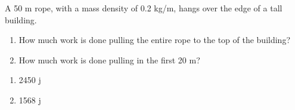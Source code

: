 {A 50 m rope, with a mass density of 0.2 kg/m, hangs over the edge of a tall building.
	\begin{enumerate}
	\item		How much work is done pulling the entire rope to the top of the building?
	\item		How much work is done pulling in the first 20 m?
	\end{enumerate}}
{\begin{enumerate}
	\item 	2450 j
	\item		1568 j
	\end{enumerate}
}
